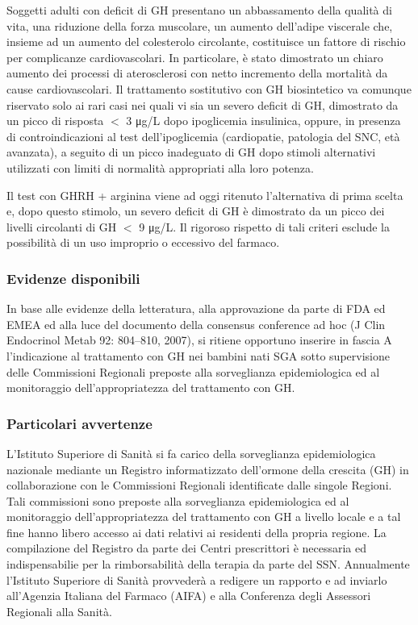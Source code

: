 Soggetti adulti con deficit di GH presentano un abbassamento della qualit\`a di vita, una riduzione della forza
muscolare, un aumento dell'adipe viscerale che, insieme ad un aumento del colesterolo circolante, costituisce
un fattore di rischio per complicanze cardiovascolari. In particolare, \`e stato dimostrato un chiaro aumento dei
processi di aterosclerosi con netto incremento della mortalit\`a da cause cardiovascolari. Il trattamento
sostitutivo con GH biosintetico va comunque riservato solo ai rari casi nei quali vi sia un severo deficit di GH,
dimostrato da un picco di risposta $<$ 3  \unit{\micro g}/L dopo ipoglicemia insulinica, oppure, in presenza di
controindicazioni al test dell'ipoglicemia (cardiopatie, patologia del SNC, et\`a avanzata), a seguito di un picco
inadeguato di GH dopo stimoli alternativi utilizzati con limiti di normalit\`a appropriati alla loro potenza. 

Il test
con GHRH + arginina viene ad oggi ritenuto l'alternativa di prima scelta e, dopo questo stimolo, un severo
deficit di GH \`e dimostrato da un picco dei livelli circolanti di GH $<$ 9 \unit{\micro g}/L. Il rigoroso rispetto di tali criteri
esclude la possibilit\`a di un uso improprio o eccessivo del farmaco.

\subsubsection*{Evidenze disponibili}

In base alle evidenze della letteratura, alla approvazione da parte di FDA ed EMEA ed alla luce del documento
della consensus conference ad hoc (J Clin Endocrinol Metab 92: 804–810, 2007), si ritiene opportuno inserire
in fascia A l'indicazione al trattamento con GH nei bambini nati SGA sotto supervisione delle Commissioni
Regionali preposte alla sorveglianza epidemiologica ed al monitoraggio dell'appropriatezza del trattamento
con GH.

\subsubsection*{Particolari avvertenze}

L'Istituto Superiore di Sanit\`a si fa carico della sorveglianza epidemiologica nazionale mediante un Registro
informatizzato dell'ormone della crescita (GH) in collaborazione con le Commissioni Regionali identificate
dalle singole Regioni. Tali commissioni sono preposte alla sorveglianza epidemiologica ed al monitoraggio
dell'appropriatezza del trattamento con GH a livello locale e a tal fine hanno libero accesso ai dati relativi ai
residenti della propria regione. La compilazione del Registro da parte dei Centri prescrittori è necessaria ed indispensabilie per la rimborsabilit\`a della
terapia da parte del SSN. Annualmente l'Istituto Superiore di Sanit\`a provveder\`a a redigere un rapporto e ad
inviarlo all'Agenzia Italiana del Farmaco (AIFA) e alla Conferenza degli Assessori Regionali alla Sanit\`a.
